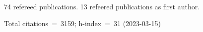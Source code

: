 74 refereed publications. 13 refeered publications as first author.

Total citations~=~3159; h-index~=~31 (2023-03-15)
